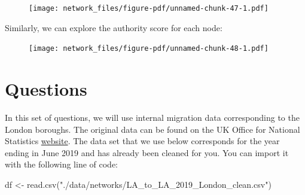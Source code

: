 \documentclass[
  letterpaper,
  DIV=11,
  numbers=noendperiod]{scrreprt}
\newenvironment{Shaded}{\begin{snugshade}}{\end{snugshade}}
\newcommand{\AttributeTok}[1]{\textcolor[rgb]{0.40,0.45,0.13}{#1}}
\newcommand{\ConstantTok}[1]{\textcolor[rgb]{0.56,0.35,0.01}{#1}}
\newcommand{\DecValTok}[1]{\textcolor[rgb]{0.68,0.00,0.00}{#1}}
\newcommand{\FunctionTok}[1]{\textcolor[rgb]{0.28,0.35,0.67}{#1}}
\newcommand{\NormalTok}[1]{\textcolor[rgb]{0.00,0.23,0.31}{#1}}
\newcommand{\OtherTok}[1]{\textcolor[rgb]{0.00,0.23,0.31}{#1}}
\newcommand{\SpecialCharTok}[1]{\textcolor[rgb]{0.37,0.37,0.37}{#1}}
\newcommand{\StringTok}[1]{\textcolor[rgb]{0.13,0.47,0.30}{#1}}
\begin{document}
\begin{figure}[H]

{\centering \texttt{[image: network\_files/figure-pdf/unnamed-chunk-47-1.pdf]}

}

\end{figure}

Similarly, we can explore the authority score for each node:

\begin{Shaded}
\end{Shaded}

\begin{figure}[H]

{\centering \texttt{[image: network\_files/figure-pdf/unnamed-chunk-48-1.pdf]}

}

\end{figure}

\hypertarget{questions-2}{%
\section{Questions}\label{questions-2}}

In this set of questions, we will use internal migration data
corresponding to the London boroughs. The original data can be found on
the UK Office for National Statistics
\href{https://www.ons.gov.uk/peoplepopulationandcommunity/populationandmigration/migrationwithintheuk/datasets/internalmigrationbyoriginanddestinationlocalauthoritiessexandsingleyearofagedetailedestimatesdataset}{website}.
The data set that we use below corresponds for the year ending in June
2019 and has already been cleaned for you. You can import it with the
following line of code:

\begin{Shaded}
\begin{Highlighting}[]
\NormalTok{df }\OtherTok{\textless{}{-}} \FunctionTok{read.csv}\NormalTok{(}\StringTok{"./data/networks/LA\_to\_LA\_2019\_London\_clean.csv"}\NormalTok{)}
\end{Highlighting}
\end{Shaded}
\end{document}
